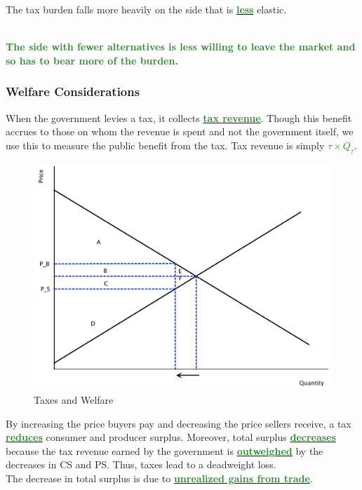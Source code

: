 \documentclass[11pt]{article}\usepackage[]{graphicx}\usepackage[]{color}
\theoremstyle{definition}
\newcommand{\ddp}[1]{{\textbf{\textcolor{ForestGreen}{#1}}}}
\newcommand{\dd}[1]{{\underline{\textbf{\textcolor{ForestGreen}{#1}}}}}
\begin{document}
	The tax burden falls more heavily on the side that is \dd{less} elastic.
	
	\ddp{\\ The side with fewer alternatives is less willing to leave the market and so has to bear more of the burden.}
	
	
	\subsubsection*{Welfare Considerations}
	
	When the government levies a tax, it collects \dd{tax revenue}. Though this benefit accrues to those on whom the revenue is spent and not the government itself, we use this to measure the public benefit from the tax. Tax revenue is simply \dd{$\tau \times Q_{\tau}$}. 
	
		\begin{figure}[H]
			\centering
			\includegraphics[scale=.3]{plot44.pdf}
			\caption{Taxes and Welfare}
		\end{figure}

	
	By increasing the price buyers pay and decreasing the price sellers receive, a tax \dd{reduces} consumer and producer surplus. Moreover, total surplus \dd{decreases} because the tax revenue earned by the government is \dd{outweighed} by the decreases in CS and PS. Thus, taxes lead to a deadweight loss.
	\\
	
	The decrease in total surplus is due to \dd{unrealized gains from trade}.
	\\
	
\end{document}
